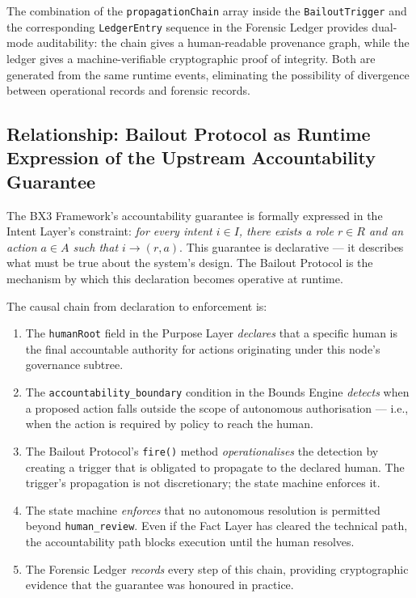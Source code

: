 The combination of the \texttt{propagationChain} array inside the \texttt{BailoutTrigger}
and the corresponding \texttt{LedgerEntry} sequence in the Forensic Ledger provides
dual-mode auditability: the chain gives a human-readable provenance graph, while the
ledger gives a machine-verifiable cryptographic proof of integrity.  Both are generated
from the same runtime events, eliminating the possibility of divergence between
operational records and forensic records.

\subsection{Relationship: Bailout Protocol as Runtime Expression of
            the Upstream Accountability Guarantee}

The BX3 Framework's accountability guarantee is formally expressed in the Intent
Layer's constraint: \emph{for every intent $i \in I$, there exists a role $r \in R$
and an action $a \in A$ such that $i \rightarrow (r, a)$}.  This guarantee is
declarative — it describes what must be true about the system's design.  The Bailout
Protocol is the mechanism by which this declaration becomes operative at runtime.

The causal chain from declaration to enforcement is:

\begin{enumerate}
  \item The \texttt{humanRoot} field in the Purpose Layer \emph{declares} that a
        specific human is the final accountable authority for actions originating
        under this node's governance subtree.
  \item The \texttt{accountability\_boundary} condition in the Bounds Engine
        \emph{detects} when a proposed action falls outside the scope of autonomous
        authorisation — i.e., when the action is required by policy to reach the human.
  \item The Bailout Protocol's \texttt{fire()} method \emph{operationalises} the
        detection by creating a trigger that is obligated to propagate to the
        declared human.  The trigger's propagation is not discretionary; the state
        machine enforces it.
  \item The state machine \emph{enforces} that no autonomous resolution is
        permitted beyond \texttt{human\_review}.  Even if the Fact Layer has cleared
        the technical path, the accountability path blocks execution until the human
        resolves.
  \item The Forensic Ledger \emph{records} every step of this chain, providing
        cryptographic evidence that the guarantee was honoured in practice.
\end{enumerate}


